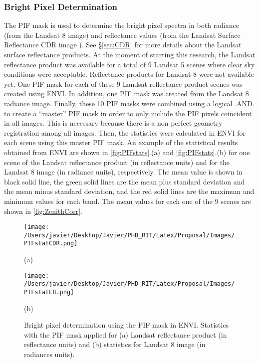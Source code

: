 \subsubsection{Bright Pixel Determination}
The PIF mask is used to determine the bright pixel spectra in both radiance (from the Landsat 8 image) and reflectance values (from the Landsat Surface Reflectance CDR image \citep{LandsatCDR,L8SurfProduct2015}). See \S\ref{sec:CDR} for more details about the Landsat surface reflectance products. At the moment of starting this research, the Landsat reflectance product was available for a total of 9 Landsat 5 scenes where clear sky conditions were acceptable. Reflectance products for Landsat 8 were not available yet. One PIF mask for each of these 9 Landsat reflectance product scenes was created using ENVI. In addition, one PIF mask was created from the Landsat 8 radiance image. Finally, these 10 PIF masks were combined using a logical .AND. to create a ``master'' PIF mask  in order to only include the PIF pixels coincident in all images. This is necessary because there is a non perfect geometry registration among all images. Then, the statistics were calculated in ENVI for each scene using this master PIF mask. An example of the statistical results obtained from ENVI are shown in \autoref{fig:PIFstats}.(a) and \autoref{fig:PIFstats}.(b) for one scene of the Landsat reflectance product (in reflectance units) and for the Landsat 8 image (in radiance units), respectively. The mean value is shown in black solid line, the green solid lines are the mean plus standard deviation and the mean minus standard deviation, and the red solid lines are the maximum and minimum values for each band. The mean values for each one of the 9 scenes are shown in \autoref{fig:ZenithCorr}. 

\begin{figure}[!ht]
  \begin{minipage}[c]{0.48\linewidth}
    \centering
      \texttt{[image: /Users/javier/Desktop/Javier/PHD\_RIT/Latex/Proposal/Images/PIFstatCDR.png]}  
    \centerline{(a)}\medskip
  \end{minipage}
  \hfill
  \begin{minipage}[d]{0.48\linewidth}
    \centering
      \texttt{[image: /Users/javier/Desktop/Javier/PHD\_RIT/Latex/Proposal/Images/PIFstatL8.png]}
    \centerline{(b)}\medskip
  \end{minipage}
  \caption{Bright pixel determination using the PIF mask in ENVI. Statistics with the PIF mask applied for (a) Landsat reflectance product (in reflectance units) and (b) statistics for Landsat 8 image (in radiances units). \label{fig:PIFstats} } 
\end{figure}

